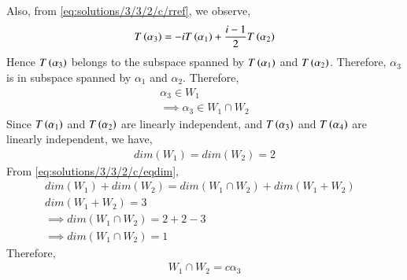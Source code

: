 Also, from \eqref{eq:solutions/3/3/2/c/rref}, we observe,
\begin{align}
   T\left(\alpha_3\right)=-i T\left(\alpha_1\right)+\frac{i-1}{2}T\left(\alpha_2\right) 
\end{align}
 Hence $T\left(\alpha_3\right)$ belongs to the subspace spanned by $T\left(\alpha_1\right)$ and $T\left(\alpha_2\right)$.\newline
 Therefore, $\alpha_3$ is in subspace spanned by  $\alpha_1$ and $\alpha_2$. Therefore,
 \begin{align}
     \alpha_3 \in W_1\\
     \implies \alpha_3 \in W_1 {\displaystyle \cap } W_2\label{eq:solutions/3/3/2/c/eq2}
 \end{align}
  Since $T\left(\alpha_1\right)$ and $T\left(\alpha_2\right)$ are linearly independent, and $T\left(\alpha_3\right)$ and $T\left(\alpha_4\right)$ are linearly independent, we have,
  \begin{align}
      dim(W_1) = dim(W_2) = 2
  \end{align}
  From \eqref{eq:solutions/3/3/2/c/eqdim},
  \begin{align}
      dim(W_1)+dim(W_2)=dim(W_1 {\displaystyle \cap } W_2)+dim(W_1+W_2)&\\
      dim(W_1+W_2)=3&\\
      \implies dim(W_1 {\displaystyle \cap } W_2)=2+2-3&\\
      \implies dim(W_1 {\displaystyle \cap } W_2)=1&
  \end{align}
  Therefore,
  \begin{align}
      W_1 {\displaystyle \cap } W_2=c\alpha_3
  \end{align}
